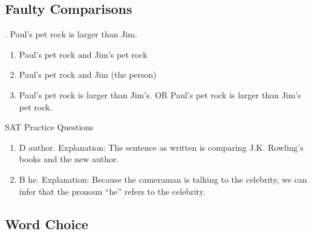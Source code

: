 \subsection{Faulty Comparisons}

. Paul's pet rock is larger than Jim.

\bigskip
\begin{enumerate}
\item Paul's pet rock and Jim's pet rock
\item Paul's pet rock and Jim (the person)
\item Paul's pet rock is larger than Jim's. OR Paul's pet rock is larger than Jim's pet rock.
\end{enumerate}

\bigskip
SAT Practice Questions

\bigskip
\begin{enumerate}
\item D author. Explanation: The sentence as written is comparing J.K. Rowling's books and the new author. 

\item B he. Explanation: Because the cameraman is talking to the celebrity, we can infer that the pronoun ``he'' refers to the celebrity. 
\end{enumerate}

\subsection{Word Choice}

